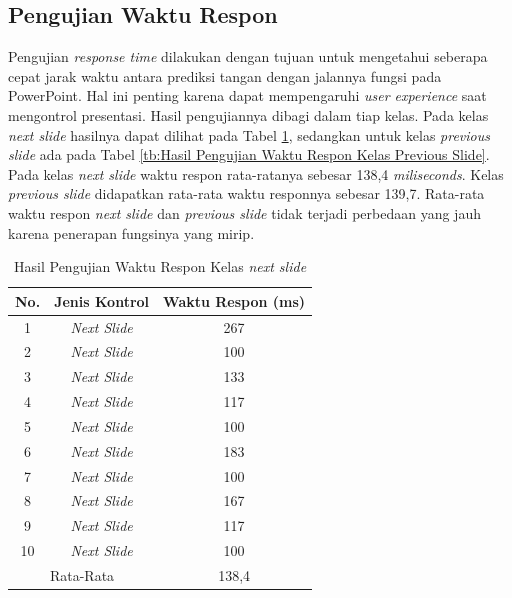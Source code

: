 \subsection{Pengujian Waktu Respon}
\label{subsec:Pengujian Waktu Respon}
Pengujian \emph{response time} dilakukan dengan tujuan untuk mengetahui seberapa cepat jarak waktu antara prediksi tangan dengan jalannya fungsi pada PowerPoint. Hal ini penting karena dapat mempengaruhi \emph{user experience} saat mengontrol presentasi. Hasil pengujiannya dibagi dalam tiap kelas. Pada kelas \emph{next slide} hasilnya dapat dilihat pada Tabel \ref{tb:Hasil Pengujian Waktu Respon Kelas Next Slide}, sedangkan untuk kelas \emph{previous slide} ada pada Tabel \ref{tb:Hasil Pengujian Waktu Respon Kelas Previous Slide}. Pada kelas \emph{next slide} waktu respon rata-ratanya sebesar 138,4 \emph{miliseconds}. Kelas \emph{previous slide} didapatkan rata-rata waktu responnya sebesar 139,7. Rata-rata waktu respon \emph{next slide} dan \emph{previous slide} tidak terjadi perbedaan yang jauh karena penerapan fungsinya yang mirip. 

\begin{longtable}{|c|c|c|}
  \caption{Hasil Pengujian Waktu Respon Kelas \emph{next slide}}
  \label{tb:Hasil Pengujian Waktu Respon Kelas Next Slide}\\
  \hline
  \rowcolor[HTML]{FFFFFF}
  \textbf{No.} & \textbf{Jenis Kontrol} & \textbf{Waktu Respon (ms)} \\
  \hline
  1 & \emph{Next Slide} & 267 \\
  2 & \emph{Next Slide} & 100 \\
  3 & \emph{Next Slide} & 133 \\
  4 & \emph{Next Slide} & 117 \\
  5 & \emph{Next Slide} & 100 \\
  6 & \emph{Next Slide} & 183 \\
  7 & \emph{Next Slide} & 100 \\
  8 & \emph{Next Slide} & 167 \\
  9 & \emph{Next Slide} & 117 \\
  10 & \emph{Next Slide} & 100 \\
  \hline
  \multicolumn{2}{|c|}{Rata-Rata} & 138,4 \\
  \hline
\end{longtable}

